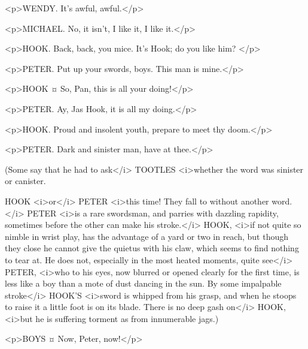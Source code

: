 \begin{drama}
<p>WENDY. It's awful, awful.</p>

<p>MICHAEL. No, it isn't, I like it, I like it.</p>


<p>HOOK. Back, back, you mice. It's Hook; do you like him?
</p>

<p>PETER. Put up your swords, boys. This man is mine.</p>


<p>HOOK ¤
So, Pan, this is all your doing!</p>

<p>PETER. Ay, Jas Hook, it is all my doing.</p>

<p>HOOK. Proud and insolent youth, prepare to meet thy doom.</p>

<p>PETER. Dark and sinister man, have at thee.</p>

\begin{stagedir}
(Some say that he had to ask</i> TOOTLES <i>whether the word was sinister or canister.

HOOK <i>or</i> PETER <i>this time! They fall to without another word.</i> PETER <i>is a rare swordsman, and parries with dazzling rapidity, sometimes before the other can make his stroke.</i> HOOK, <i>if not quite so nimble in wrist play, has the advantage of a yard or two in reach, but though they close he cannot give the quietus with his claw, which seems to find nothing to tear at. He does not, especially in the most heated moments, quite see</i> PETER, <i>who to his eyes, now blurred or opened clearly for the first time, is less like a boy than a mote of dust dancing in the sun. By some impalpable stroke</i> HOOK'S <i>sword is whipped from his grasp, and when he stoops to raise it a little foot is on its blade. There is no deep gash on</i> HOOK, <i>but he is suffering torment as from innumerable jags.)
\end{stagedir}

<p>BOYS ¤
Now, Peter, now!</p>



\end{drama}

